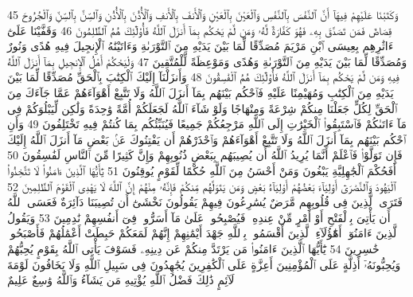 {\tiny\colorbox{cl_aya}{45}} وَكَتَبْنَا عَلَيْهِمْ فِيهَآ أَنَّ ٱلنَّفْسَ بِٱلنَّفْسِ وَٱلْعَيْنَ بِٱلْعَيْنِ وَٱلْأَنفَ بِٱلْأَنفِ وَٱلْأُذُنَ بِٱلْأُذُنِ وَٱلسِّنَّ بِٱلسِّنِّ وَٱلْجُرُوحَ قِصَاصٌ فَمَن تَصَدَّقَ بِهِۦ فَهُوَ كَفَّارَةٌ لَّهُۥ وَمَن لَّمْ يَحْكُم بِمَآ أَنزَلَ ٱللَّهُ فَأُو۟لَٰٓئِكَ هُمُ ٱلظَّٰلِمُونَ
{\tiny\colorbox{cl_aya}{46}} وَقَفَّيْنَا عَلَىٰٓ ءَاثَٰرِهِم بِعِيسَى ٱبْنِ مَرْيَمَ مُصَدِّقًا لِّمَا بَيْنَ يَدَيْهِ مِنَ ٱلتَّوْرَىٰةِ وَءَاتَيْنَٰهُ ٱلْإِنجِيلَ فِيهِ هُدًى وَنُورٌ وَمُصَدِّقًا لِّمَا بَيْنَ يَدَيْهِ مِنَ ٱلتَّوْرَىٰةِ وَهُدًى وَمَوْعِظَةً لِّلْمُتَّقِينَ
{\tiny\colorbox{cl_aya}{47}} وَلْيَحْكُمْ أَهْلُ ٱلْإِنجِيلِ بِمَآ أَنزَلَ ٱللَّهُ فِيهِ وَمَن لَّمْ يَحْكُم بِمَآ أَنزَلَ ٱللَّهُ فَأُو۟لَٰٓئِكَ هُمُ ٱلْفَٰسِقُونَ
{\tiny\colorbox{cl_aya}{48}} وَأَنزَلْنَآ إِلَيْكَ ٱلْكِتَٰبَ بِٱلْحَقِّ مُصَدِّقًا لِّمَا بَيْنَ يَدَيْهِ مِنَ ٱلْكِتَٰبِ وَمُهَيْمِنًا عَلَيْهِ فَٱحْكُم بَيْنَهُم بِمَآ أَنزَلَ ٱللَّهُ وَلَا تَتَّبِعْ أَهْوَآءَهُمْ عَمَّا جَآءَكَ مِنَ ٱلْحَقِّ لِكُلٍّ جَعَلْنَا مِنكُمْ شِرْعَةً وَمِنْهَاجًا وَلَوْ شَآءَ ٱللَّهُ لَجَعَلَكُمْ أُمَّةً وَٰحِدَةً وَلَٰكِن لِّيَبْلُوَكُمْ فِى مَآ ءَاتَىٰكُمْ فَٱسْتَبِقُوا۟ ٱلْخَيْرَٰتِ إِلَى ٱللَّهِ مَرْجِعُكُمْ جَمِيعًا فَيُنَبِّئُكُم بِمَا كُنتُمْ فِيهِ تَخْتَلِفُونَ
{\tiny\colorbox{cl_aya}{49}} وَأَنِ ٱحْكُم بَيْنَهُم بِمَآ أَنزَلَ ٱللَّهُ وَلَا تَتَّبِعْ أَهْوَآءَهُمْ وَٱحْذَرْهُمْ أَن يَفْتِنُوكَ عَنۢ بَعْضِ مَآ أَنزَلَ ٱللَّهُ إِلَيْكَ فَإِن تَوَلَّوْا۟ فَٱعْلَمْ أَنَّمَا يُرِيدُ ٱللَّهُ أَن يُصِيبَهُم بِبَعْضِ ذُنُوبِهِمْ وَإِنَّ كَثِيرًا مِّنَ ٱلنَّاسِ لَفَٰسِقُونَ
{\tiny\colorbox{cl_aya}{50}} أَفَحُكْمَ ٱلْجَٰهِلِيَّةِ يَبْغُونَ وَمَنْ أَحْسَنُ مِنَ ٱللَّهِ حُكْمًا لِّقَوْمٍ يُوقِنُونَ
{\tiny\colorbox{cl_aya}{51}} يَٰٓأَيُّهَا ٱلَّذِينَ ءَامَنُوا۟ لَا تَتَّخِذُوا۟ ٱلْيَهُودَ وَٱلنَّصَٰرَىٰٓ أَوْلِيَآءَ بَعْضُهُمْ أَوْلِيَآءُ بَعْضٍ وَمَن يَتَوَلَّهُم مِّنكُمْ فَإِنَّهُۥ مِنْهُمْ إِنَّ ٱللَّهَ لَا يَهْدِى ٱلْقَوْمَ ٱلظَّٰلِمِينَ
{\tiny\colorbox{cl_aya}{52}} فَتَرَى ٱلَّذِينَ فِى قُلُوبِهِم مَّرَضٌ يُسَٰرِعُونَ فِيهِمْ يَقُولُونَ نَخْشَىٰٓ أَن تُصِيبَنَا دَآئِرَةٌ فَعَسَى ٱللَّهُ أَن يَأْتِىَ بِٱلْفَتْحِ أَوْ أَمْرٍ مِّنْ عِندِهِۦ فَيُصْبِحُوا۟ عَلَىٰ مَآ أَسَرُّوا۟ فِىٓ أَنفُسِهِمْ نَٰدِمِينَ
{\tiny\colorbox{cl_aya}{53}} وَيَقُولُ ٱلَّذِينَ ءَامَنُوٓا۟ أَهَٰٓؤُلَآءِ ٱلَّذِينَ أَقْسَمُوا۟ بِٱللَّهِ جَهْدَ أَيْمَٰنِهِمْ إِنَّهُمْ لَمَعَكُمْ حَبِطَتْ أَعْمَٰلُهُمْ فَأَصْبَحُوا۟ خَٰسِرِينَ
{\tiny\colorbox{cl_aya}{54}} يَٰٓأَيُّهَا ٱلَّذِينَ ءَامَنُوا۟ مَن يَرْتَدَّ مِنكُمْ عَن دِينِهِۦ فَسَوْفَ يَأْتِى ٱللَّهُ بِقَوْمٍ يُحِبُّهُمْ وَيُحِبُّونَهُۥٓ أَذِلَّةٍ عَلَى ٱلْمُؤْمِنِينَ أَعِزَّةٍ عَلَى ٱلْكَٰفِرِينَ يُجَٰهِدُونَ فِى سَبِيلِ ٱللَّهِ وَلَا يَخَافُونَ لَوْمَةَ لَآئِمٍ ذَٰلِكَ فَضْلُ ٱللَّهِ يُؤْتِيهِ مَن يَشَآءُ وَٱللَّهُ وَٰسِعٌ عَلِيمٌ
